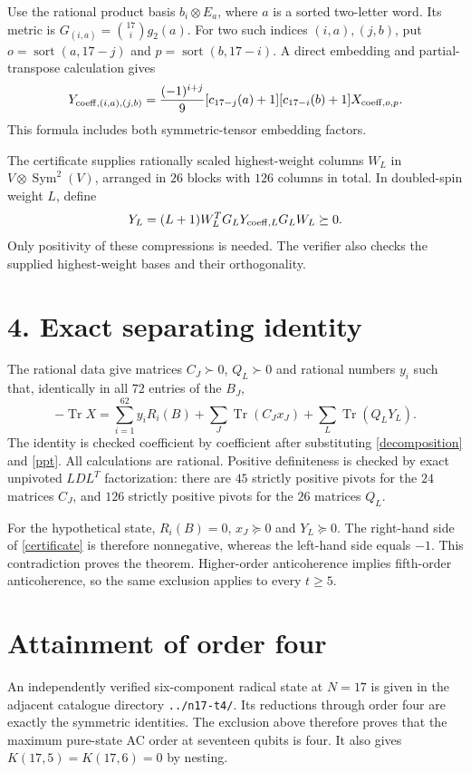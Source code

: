 \documentclass[11pt]{article}
\newcommand{\Tr}{\operatorname{Tr}}
\begin{document}
Use the rational product basis $b_i\otimes E_a$, where $a$ is a sorted
two-letter word. Its metric is
$G_{(i,a)}=\binom{17}{i}g_2(a)$.
For two such indices $(i,a),(j,b)$, put
$o=\operatorname{sort}(a,17-j)$ and
$p=\operatorname{sort}(b,17-i)$.
A direct embedding and partial-transpose calculation gives
\begin{equation}\label{ppt}
 Y_{{\rm coeff},(i,a),(j,b)}=
 \frac{(-1)^{i+j}}{9}
 [c_{17-j}(a)+1][c_{17-i}(b)+1]
 X_{{\rm coeff},o,p}.
\end{equation}
This formula includes both symmetric-tensor embedding factors.

The certificate supplies rationally scaled highest-weight columns $W_L$
in $V\otimes\operatorname{Sym}^{2}(V)$, arranged in $26$ blocks with $126$
columns in total. In doubled-spin weight $L$, define
\[
 Y_L=(L+1)W_L^TG_LY_{{\rm coeff},L}G_LW_L\succeq0.
\]
Only positivity of these compressions is needed. The verifier also checks
the supplied highest-weight bases and their orthogonality.

\section*{4. Exact separating identity}
The rational data give matrices $C_J\succ0$, $Q_L\succ0$ and rational
numbers $y_i$ such that, identically in all $72$ entries of the $B_J$,
\begin{equation}\label{certificate}
 -\Tr X=\sum_{i=1}^{62}y_iR_i(B)
       +\sum_J\Tr(C_Jx_J)+\sum_L\Tr(Q_LY_L).
\end{equation}
The identity is checked coefficient by coefficient after substituting
\eqref{decomposition} and \eqref{ppt}. All calculations are rational.
Positive definiteness is checked by exact unpivoted $LDL^T$ factorization:
there are $45$ strictly positive pivots for the $24$ matrices $C_J$, and
$126$ strictly positive pivots for the $26$ matrices $Q_L$.

For the hypothetical state, $R_i(B)=0$, $x_J\succeq0$ and $Y_L\succeq0$.
The right-hand side of \eqref{certificate} is therefore nonnegative,
whereas the left-hand side equals $-1$. This contradiction proves the
theorem. Higher-order anticoherence implies fifth-order anticoherence,
so the same exclusion applies to every $t\geq5$.

\section*{Attainment of order four}
An independently verified six-component radical state at $N=17$ is given
in the adjacent catalogue directory \texttt{../n17-t4/}. Its reductions
through order four are exactly the symmetric identities. The exclusion
above therefore proves that the maximum pure-state AC order at seventeen
qubits is four. It also gives $K(17,5)=K(17,6)=0$ by nesting.
\end{document}
